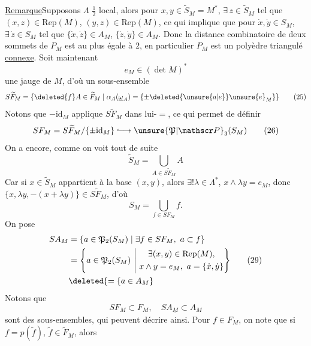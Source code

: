 \uline{Remarque}\quad Supposons $\Lambda$ $\tfrac12$ local, alors pour $x,y\in\widetilde S_M=M^*$, $\exists\,z\in\widetilde S_M$ tel que $(x,z)\in\mathrm{Rep}(M)$, $(y,z)\in\mathrm{Rep}(M)$, ce qui implique que pour $\dot x,\dot y\in S_M$, $\exists\,\dot z\in S_M$ tel que $\{\dot x,\dot z\}\in A_M$, $\{\dot z,\dot y\}\in A_M$. Donc la distance combinatoire de deux  sommets de $P_M$ est au plus égale à $2$, en particulier $P_M$ est un polyèdre triangulé \uline{connexe}.
Soit maintenant
\[
e_M\in(\det M)^*\tag*{(24)}
\]
une jauge de $M$, d'où un sous-ensemble
\[
S\widetilde F_M=\{\deleted{f}A\in\widetilde F_M\mid\alpha_A(\underline{\omega}_A)=\{\pm\deleted{\unsure{a|e}}\unsure{e}_M\}\}\tag*{(25)}
\]
Notons que $-\mathrm{id}_M$ applique $S\widetilde F_M$ dans lui-$=$, ce qui permet de définir
\[
SF_M=S\widetilde F_M/\{\pm\mathrm{id}_M\}\lhook\joinrel\longrightarrow\unsure{\mathfrak P|\mathscr P}_3(S_M)\tag*{(26)}
\]
On a encore, comme on voit tout de suite
\[
\widetilde S_M=\bigcup_{A\in S\widetilde F_M}A\tag*{(27)}
\]
Car si $x\in\widetilde S_M$ appartient à la base $(x,y)$, alors $\exists!\lambda\in\Lambda^*$,   $x\wedge\lambda y=e_M$, donc $\{x,\lambda y,-(x+\lambda y)\}\in S\widetilde F_M$, d'où
\[
S_M=\bigcup_{f\in SF_M}f.\tag*{(28)}
\]
On pose
\[
\begin{aligned}
SA_M&=\{a\in\mathfrak P_2(S_M)\mid\exists f\in SF_M,\ a\subset f\}\\
&=\left\{a\in\mathfrak P_2(S_M)\ \middle|\
\begin{gathered}\exists(x,y)\in\mathrm{Rep}(M),\\ x\wedge y=e_M,\ a=\{\dot x,\dot y\}\end{gathered}\right\}\\
&\deleted{=\{a\in A_M}
\end{aligned}\tag*{(29)}
\]
Notons que
\[
SF_M\subset F_M,\quad SA_{\underline M}\subset A_M\tag*{(30)}
\]
 sont des sous-ensembles, qui peuvent 
décrire ainsi. Pour $f\in F_M$,  on note que  si $f=p(\widetilde f)$, $\widetilde f\in\widetilde F_M$, alors  
